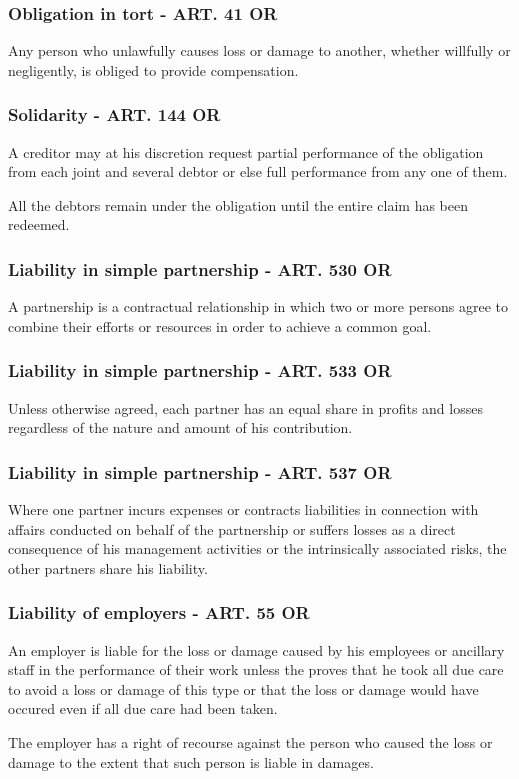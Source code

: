 \subsubsection{Obligation in tort - ART. 41 OR}
Any person who unlawfully causes loss or damage to another, whether willfully or negligently, is obliged to provide compensation.

\subsubsection{Solidarity - ART. 144 OR}
\begin{compactenum}
	\item A creditor may at his discretion request partial performance of the obligation from each joint and several debtor or else full performance from any one of them.
	\item All the debtors remain under the obligation until the entire claim has been redeemed.
\end{compactenum}

\subsubsection{Liability in simple partnership - ART. 530 OR}
A partnership is a contractual relationship in which two or more persons agree to combine their efforts or resources in order to achieve a common goal.

\subsubsection{Liability in simple partnership - ART. 533 OR}
Unless otherwise agreed, each partner has an equal share in profits and losses regardless of the nature and amount of his contribution.

\subsubsection{Liability in simple partnership - ART. 537 OR}
Where one partner incurs expenses or contracts liabilities in connection with affairs conducted on behalf of the partnership or suffers losses as a direct consequence of his management activities or the intrinsically associated risks, the other partners share his liability.

\subsubsection{Liability of employers - ART. 55 OR}
\begin{compactenum}
	\item An employer is liable for the loss or damage caused by his employees or ancillary staff in the performance of their work unless the proves that he took all due care to avoid a loss or damage of this type or that the loss or damage would have occured even if all due care had been taken.
	\item The employer has a right of recourse against the person who caused the loss or damage to the extent that such person is liable in damages.
\end{compactenum}

